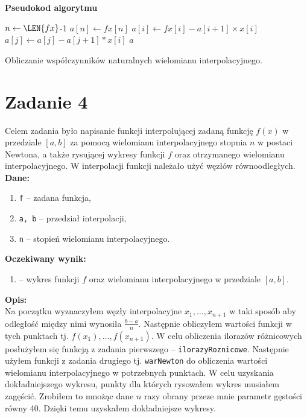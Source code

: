 \documentclass[]{article}
\begin{document}
	\noindent\textbf{Pseudokod algorytmu}\\
	\begin{algorithm}[h]
		\DontPrintSemicolon
		 {
			$n \gets \LEN{fx}$-1\;
			$a[n] \gets fx[n]$\;
			 {
				$a[i] \gets fx[i] - a[i+1] \times x[i]$\; 
				 {
					$a[j] \gets a[j] - a[j+1] * x[i]$\; 	
				}	
			}
			\KwRet $a$\;
		}
		
		\caption{Obliczanie współczynników naturalnych wielomianu interpolacyjnego.}
	\end{algorithm}	
	
	
	\clearpage
	
	\section*{Zadanie 4}

	Celem zadania było napisanie funkcji interpolującej zadaną funkcję $f(x)$ w przedziale $[a, b]$ za pomocą wielomianu interpolacyjnego stopnia $n$ w postaci Newtona, a także rysującej wykresy funkcji $f$ oraz otrzymanego wielomianu interpolacyjnego. W interpolacji funkcji należało użyć węzłów równoodległych.\\
	\textbf{Dane:}
	\begin{enumerate}[]
		\item \texttt{f} -- zadana funkcja,
		\item \texttt{a, b} --  przedział interpolacji,
		\item \texttt{n} --  stopień wielomianu interpolacyjnego.
	\end{enumerate}
	\textbf{Oczekiwany wynik:}
	\begin{enumerate}[]
		\item -- wykres funkcji $f$ oraz wielomianu interpolacyjnego w przedziale $[a,b]$.
	\end{enumerate}
	\textbf{Opis:}\\
	Na początku wyznaczyłem węzły interpolacyjne $x_1, \ldots, x_{n+1}$ w taki sposób aby odległość między nimi wynosiła $\frac{b-a}{n}$. Następnie obliczyłem wartości funkcji w tych punktach tj. $f(x_1), \ldots, f(x_{n+1})$.
	W celu obliczenia ilorazów różnicowych posłużyłem się funkcją z zadania pierwszego -- \texttt{ilorazyRoznicowe}. Następnie użyłem funkcji z zadania drugiego tj. \texttt{warNewton} do obliczenia wartości wielomianu interpolacyjnego w potrzebnych punktach. W celu uzyskania dokładniejszego wykresu, punkty dla których rysowałem wykres musiałem zagęścić. Zrobiłem to mnożąc dane $n$ razy obrany przeze mnie parametr gęstości równy 40. Dzięki temu uzyskałem dokładniejsze wykresy.
	
\end{document}
